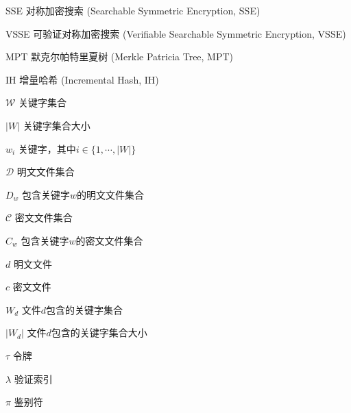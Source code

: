 \begin{denotation}[3cm]
\item[SSE] 对称加密搜索 (Searchable Symmetric Encryption, SSE)
\item[VSSE] 可验证对称加密搜索 (Verifiable Searchable Symmetric Encryption, VSSE)
\item[MPT] 默克尔帕特里夏树 (Merkle Patricia Tree, MPT)
\item[IH] 增量哈希 (Incremental Hash, IH)
\item[$\mathcal{W}$] 关键字集合
\item[$|W|$] 关键字集合大小
\item[$w_i$ ] 关键字，其中$i \in \{1, \cdots, |W|\}$
\item[$\mathcal{D}$] 明文文件集合
\item[$D_{w}$] 包含关键字$w$的明文文件集合
\item[$\mathcal{C}$] 密文文件集合
\item[$C_{w}$] 包含关键字$w$的密文文件集合
\item[$d$] 明文文件
\item[$c$] 密文文件
\item[$W_d$] 文件$d$包含的关键字集合
\item[$|W_d|$] 文件$d$包含的关键字集合大小
\item[$\tau$]	令牌
\item[$\lambda$] 验证索引
\item[$\pi$] 鉴别符
\end{denotation}
